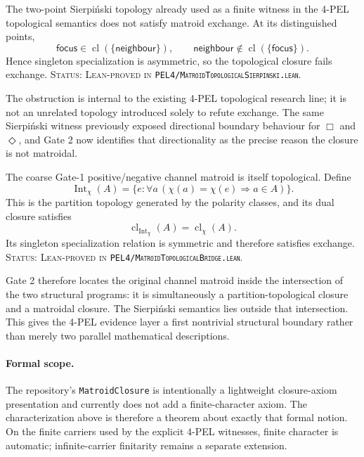 \begin{proposition}
The two-point Sierpiński topology already used as a finite witness in the 4-PEL
topological semantics does not satisfy matroid exchange. At its distinguished
points,
\[
  \mathsf{focus}\in\operatorname{cl}(\{\mathsf{neighbour}\}),
  \qquad
  \mathsf{neighbour}\notin\operatorname{cl}(\{\mathsf{focus}\}).
\]
Hence singleton specialization is asymmetric, so the topological closure fails
exchange.
\textup{\textsc{Status: Lean-proved in
\texttt{PEL4/MatroidTopologicalSierpinski.lean}.}}
\end{proposition}

The obstruction is internal to the existing 4-PEL topological research line;
it is not an unrelated topology introduced solely to refute exchange. The same
Sierpiński witness previously exposed directional boundary behaviour for
\(\Box\) and \(\Diamond\), and Gate 2 now identifies that directionality as the
precise reason the closure is not matroidal.

\begin{proposition}
The coarse Gate-1 positive/negative channel matroid is itself topological.
Define
\[
  \operatorname{Int}_{\chi}(A)
  =\{e : \forall a\,(\chi(a)=\chi(e)\Rightarrow a\in A)\}.
\]
This is the partition topology generated by the polarity classes, and its dual
closure satisfies
\[
  \operatorname{cl}_{\operatorname{Int}_{\chi}}(A)
  =\operatorname{cl}_{\chi}(A).
\]
Its singleton specialization relation is symmetric and therefore satisfies
exchange.
\textup{\textsc{Status: Lean-proved in
\texttt{PEL4/MatroidTopologicalBridge.lean}.}}
\end{proposition}

Gate 2 therefore locates the original channel matroid inside the intersection
of the two structural programs: it is simultaneously a partition-topological
closure and a matroidal closure. The Sierpiński semantics lies outside that
intersection. This gives the 4-PEL evidence layer a first nontrivial structural
boundary rather than merely two parallel mathematical descriptions.

\paragraph{Formal scope.}
The repository's \texttt{MatroidClosure} is intentionally a lightweight
closure-axiom presentation and currently does not add a finite-character axiom.
The characterization above is therefore a theorem about exactly that formal
notion. On the finite carriers used by the explicit 4-PEL witnesses, finite
character is automatic; infinite-carrier finitarity remains a separate
extension.

